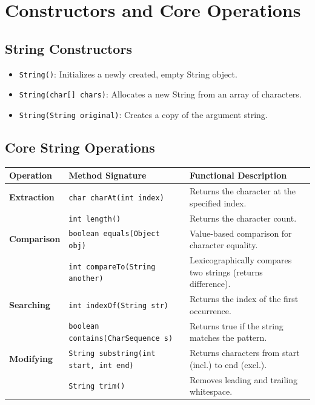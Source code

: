 \documentclass[12pt,a4paper]{article}
\renewcommand{\arraystretch}{1.45}
\begin{document}
\section{Constructors and Core Operations}

\subsection{String Constructors}
\begin{itemize}[leftmargin=*, itemsep=3pt]
  \item \texttt{String()}: Initializes a newly created, empty String object.
  \item \texttt{String(char[] chars)}: Allocates a new String from an array of characters.
  \item \texttt{String(String original)}: Creates a copy of the argument string.
\end{itemize}

\subsection{Core String Operations}
\par\noindent
{\renewcommand{\arraystretch}{1.45}%
\begin{tabularx}{\linewidth}{|B{2.8cm}|B{4.5cm}|Y|}
\hline
\textbf{Operation} & \textbf{Method Signature} & \textbf{Functional Description} \\
\hline
\textbf{Extraction} & \texttt{char charAt(int index)} & Returns the character at the specified index. \\
                    & \texttt{int length()} & Returns the character count. \\
\hline
\textbf{Comparison} & \texttt{boolean equals(Object obj)} & Value-based comparison for character equality. \\
                    & \texttt{int compareTo(String another)} & Lexicographically compares two strings (returns difference). \\
\hline
\textbf{Searching}  & \texttt{int indexOf(String str)} & Returns the index of the first occurrence. \\
                    & \texttt{boolean contains(CharSequence s)} & Returns true if the string matches the pattern. \\
\hline
\textbf{Modifying}  & \texttt{String substring(int start, int end)} & Returns characters from start (incl.) to end (excl.). \\
                    & \texttt{String trim()} & Removes leading and trailing whitespace. \\
\hline
\end{tabularx}}
\end{document}
